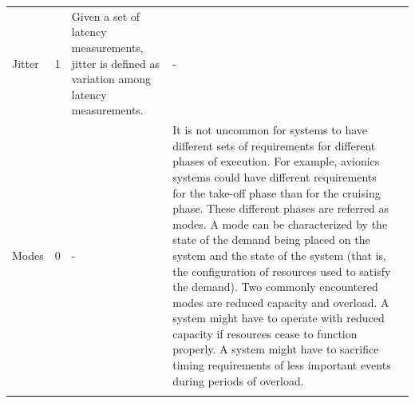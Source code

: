 {\begin{longtable}[c]{|p{0.9in}|c|p{2.3in}|p{2.3in}|c}
	\centering	Jitter                         & 1              & Given   a set of latency measurements,  jitter is defined as variation among latency measurements.                                                                                                                                                                                                                                                                                                                                                                                                                                                                                                                                                                   & \centering -                                                                                                                                                                                                                                                                                                                                                                                                                                                                                                                                                                                                                                                                                                                                                    &   \\ \hhline{|-|-|-|-|}
	\centering	Modes                          & 0              & \centering -                                                                                                                                                                                                                                                                                                                                                                                                                                                                                                                                                                                                                                                               & It   is not uncommon for systems to have different sets of requirements for   different phases of execution. For example, avionics systems could have different requirements for the take-off phase than for the cruising phase. These different phases are referred as modes. A mode can be characterized by the   state of the demand being placed on the system and the state of the system   (that is, the configuration of resources used to satisfy the demand).     Two commonly encountered modes are reduced capacity and overload. A system   might have to operate with reduced capacity if resources cease to function   properly. A system might have to sacrifice timing requirements of less   important events during periods of overload. &   \\ \hhline{|-|-|-|-|}

\end{longtable}}
